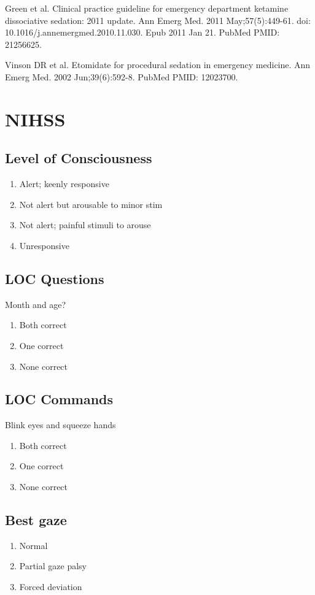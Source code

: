 \documentclass[8pt]{extarticle}
\begin{document}
\tiny{Green et al. Clinical practice guideline for emergency department ketamine dissociative sedation: 2011 update. Ann Emerg Med. 2011 May;57(5):449-61. doi: 10.1016/j.annemergmed.2010.11.030. Epub 2011 Jan 21. 
PubMed PMID: 21256625.}

\tiny{Vinson DR et al. Etomidate for procedural sedation in emergency medicine. Ann Emerg Med. 2002 Jun;39(6):592-8. PubMed PMID: 12023700.}

\newpage

\section{NIHSS}

\begin{multicols*}{2}
\subsection{Level of Consciousness}
\begin{enumerate}
    \item{Alert; keenly responsive}
    \item{Not alert but arousable to minor stim}
    \item{Not alert; painful stimuli to arouse}
    \item{Unresponsive}
\end{enumerate}

\subsection{LOC Questions}
Month and age?
\begin{enumerate}
    \item{Both correct}
    \item{One correct}
    \item{None correct}
\end{enumerate}

\subsection{LOC Commands}
Blink eyes and squeeze hands
\begin{enumerate}
    \item{Both correct}
    \item{One correct}
    \item{None correct}
\end{enumerate}

\subsection{Best gaze}
\begin{enumerate}
    \item{Normal}
    \item{Partial gaze palsy}
    \item{Forced deviation}
\end{enumerate}


\end{multicols*}
\end{document}
